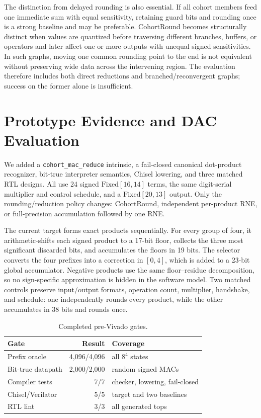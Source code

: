 \documentclass[conference]{IEEEtran}
\begin{document}
The distinction from delayed rounding is also essential. If all cohort members
feed one immediate sum with equal sensitivity, retaining guard bits and rounding
once is a strong baseline and may be preferable. CohortRound becomes structurally
distinct when values are quantized before traversing different branches,
buffers, or operators and later affect one or more outputs with unequal signed
sensitivities. In such graphs, moving one common rounding point to the end is not
equivalent without preserving wide data across the intervening region. The
evaluation therefore includes both direct reductions and branched/reconvergent
graphs; success on the former alone is insufficient.

\section{Prototype Evidence and DAC Evaluation}

We added a \texttt{cohort\_mac\_reduce} intrinsic, a fail-closed canonical
dot-product recognizer, bit-true interpreter semantics, Chisel lowering, and
three matched RTL designs. All use 24 signed $\mathrm{Fixed}[16,14]$ terms, the
same digit-serial multiplier and control schedule, and a
$\mathrm{Fixed}[20,13]$ output. Only the rounding/reduction policy changes:
CohortRound, independent per-product RNE, or full-precision accumulation
followed by one RNE.

The current target forms exact products sequentially. For every group of four,
it arithmetic-shifts each signed product to a 17-bit floor, collects the three
most significant discarded bits, and accumulates the floors in 19 bits. The
selector converts the four prefixes into a correction in $[0,4]$, which is
added to a 23-bit global accumulator. Negative products use the same
floor--residue decomposition, so no sign-specific approximation is hidden in
the software model. Two matched controls preserve input/output formats,
operation count, multiplier, handshake, and schedule: one independently rounds
every product, while the other accumulates in 38 bits and rounds once.

\begin{table}[t]
\centering
\caption{Completed pre-Vivado gates.}
\label{tab:prototype}
\footnotesize
\begin{tabular}{@{}lrl@{}}
\toprule
Gate & Result & Coverage \\
\midrule
Prefix oracle & 4,096/4,096 & all $8^4$ states \\
Bit-true datapath & 2,000/2,000 & random signed MACs \\
Compiler tests & 7/7 & checker, lowering, fail-closed \\
Chisel/Verilator & 5/5 & target and two baselines \\
RTL lint & 3/3 & all generated tops \\
\bottomrule
\end{tabular}
\end{table}
\end{document}
